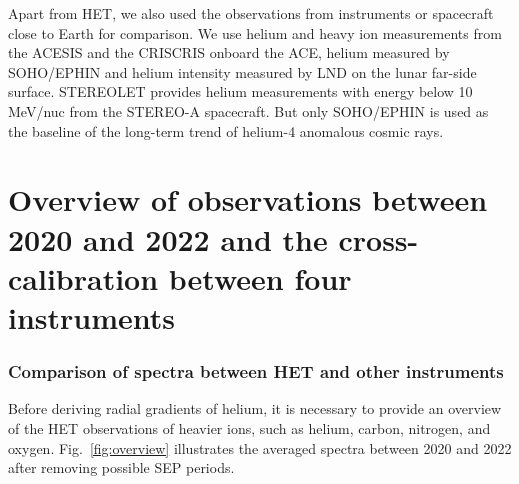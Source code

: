 
Apart from \ac{HET}, we also used the observations from instruments or spacecraft close to Earth for comparison. We use helium and heavy ion measurements from the \ac{ACESIS} and the \acl{CRIS}\ac{CRIS} onboard the \ac{ACE}, helium measured by \acl{SOHO}/\acl{EPHIN} and helium intensity measured by \acl{LND} on the lunar far-side surface. \ac{STEREOLET} provides helium measurements with energy below 10 MeV/nuc from the \ac{STEREO}-A spacecraft. But only \ac{SOHO}/\ac{EPHIN} is used as the baseline of the long-term trend of helium-4 anomalous cosmic rays.

\section{Overview of observations between 2020 and 2022 and the cross-calibration between four instruments}

\subsubsection*{Comparison of spectra between \ac{HET} and other instruments}
Before deriving radial gradients of helium, it is necessary to provide an overview of the \ac{HET} observations of heavier ions, such as helium, carbon, nitrogen, and oxygen. Fig.~\ref{fig:overview} illustrates the averaged spectra between 2020 and 2022 after removing possible \ac{SEP} periods.


